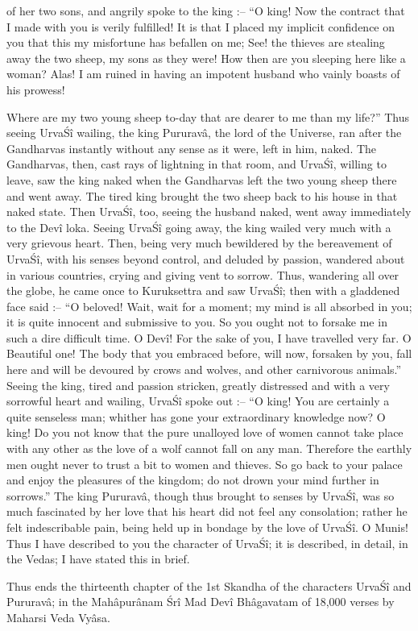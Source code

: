 of her two sons, and angrily spoke to the king :-- ``O king! Now the contract that I made with you is verily fulfilled! It is that I placed my implicit confidence on you that this my misfortune has befallen on me; See! the thieves are stealing away the two sheep, my sons as they were! How then are you sleeping here like a woman? Alas! I am ruined in having an impotent husband who vainly boasts of his prowess!

Where are my two young sheep to-day that are dearer to me than my life?'' Thus seeing Urva\'S\^i wailing, the king Pururav\^a, the lord of the Universe, ran after the Gandharvas instantly without any sense as it were, left in him, naked. The Gandharvas, then, cast rays of lightning in that room, and Urva\'S\^i, willing to leave, saw the king naked when the Gandharvas left the two young sheep there and went away. The tired king brought the two sheep back to his house in that naked state. Then Urva\'S\^i, too, seeing the husband naked, went away immediately to the Dev\^i loka. Seeing Urva\'S\^i going away, the king wailed very much with a very grievous heart. Then, being very much bewildered by the bereavement of Urva\'S\^i, with his senses beyond control, and deluded by passion, wandered about in various countries, crying and giving vent to sorrow. Thus, wandering all over the globe, he came once to Kuruksettra and saw Urva\'S\^i; then with a gladdened face said :-- ``O beloved! Wait, wait for a moment; my mind is all absorbed in you; it is quite innocent and submissive to you. So you ought not to forsake me in such a dire difficult time. O Dev\^i! For the sake of you, I have travelled very far. O Beautiful one! The body that you embraced before, will now, forsaken by you, fall here and will be devoured by crows and wolves, and other carnivorous animals.'' Seeing the king, tired and passion stricken, greatly distressed and with a very sorrowful heart and wailing, Urva\'S\^i spoke out :-- ``O king! You are certainly a quite senseless man; whither has gone your extraordinary knowledge now? O king! Do you not know that the pure unalloyed love of women cannot take place with any other as the love of a wolf cannot fall on any man. Therefore the earthly men ought never to trust a bit to women and thieves. So go back to your palace and enjoy the pleasures of the kingdom; do not drown your mind further in sorrows.'' The king Pururav\^a, though thus brought to senses by Urva\'S\^i, was so much fascinated by her love that his heart did not feel any consolation; rather he felt indescribable pain, being held up in bondage by the love of Urva\'S\^i. O Munis! Thus I have described to you the character of Urva\'S\^i; it is described, in detail, in the Vedas; I have stated this in brief.

Thus ends the thirteenth chapter of the 1st Skandha of the characters Urva\'S\^i and Pururav\^a; in the Mah\^apur\^anam \'Sr\^i Mad Dev\^i Bh\^agavatam of 18,000 verses by Maharsi Veda Vy\^asa.